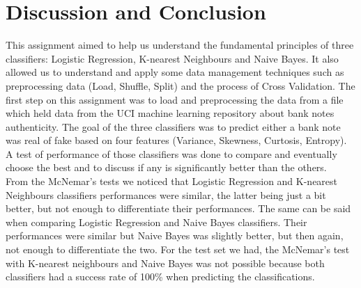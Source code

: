\documentclass[a4paper]{article}
\begin{document}
\section{Discussion and Conclusion}
This assignment aimed to help us understand the fundamental principles of three 
classifiers: Logistic Regression, K-nearest Neighbours and Naive Bayes. 
It also allowed us to understand and apply some data management techniques 
such as preprocessing data (Load, Shuffle, Split) and the process of Cross Validation. 
The first step on this assignment was to load and preprocessing the data from a 
file which held data from the UCI machine learning repository about bank notes 
authenticity. The goal of the three classifiers was to predict either a bank note 
was real of fake based on four features (Variance, Skewness, Curtosis, Entropy).
A test of performance of those classifiers was done to compare and eventually 
choose the best and to discuss if any is significantly better than the others.\\
From the McNemar's tests we noticed that Logistic Regression and K-nearest 
Neighbours classifiers performances were similar, the latter being just 
a bit better, but not enough to differentiate their performances. 
The same can be said when comparing Logistic Regression and Naive Bayes classifiers.
Their performances were similar but Naive Bayes was slightly better,
but then again, not enough to differentiate the two.
For the test set we had, the McNemar's test with K-nearest neighbours and Naive Bayes was
not possible because both classifiers had a success rate of 100\% when predicting the classifications. 
  
\clearpage
\end{document}
